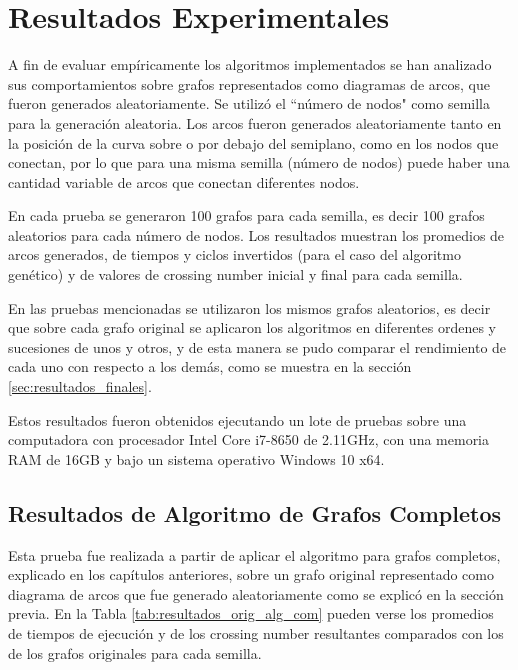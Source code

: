 \chapter{Resultados Experimentales}\label{cap5}
A fin de evaluar empíricamente los algoritmos implementados se han analizado sus comportamientos sobre grafos representados como diagramas de arcos, que fueron generados aleatoriamente. Se utilizó el ``número de nodos" como semilla para la generación aleatoria. Los arcos fueron generados aleatoriamente tanto en la posición de la curva sobre o por debajo del semiplano, como en los nodos que conectan, por lo que para una misma semilla (número de nodos) puede haber una cantidad variable de arcos que conectan diferentes nodos. 

En cada prueba se generaron 100 grafos para cada semilla, es decir 100 grafos aleatorios para cada número de nodos. Los resultados muestran los promedios de arcos generados, de tiempos y ciclos invertidos (para el caso del algoritmo genético) y de valores de crossing number inicial y final para cada semilla. 

En las pruebas mencionadas se utilizaron los mismos grafos aleatorios, es decir que sobre cada grafo original se aplicaron los algoritmos en diferentes ordenes y sucesiones de unos y otros, y de esta manera se pudo comparar el rendimiento de cada uno con respecto a los demás, como se muestra en la sección \ref{sec:resultados_finales}.

Estos resultados fueron obtenidos ejecutando un lote de pruebas sobre una computadora con procesador Intel Core i7-8650 de 2.11GHz, con una memoria RAM de 16GB y bajo un sistema operativo Windows 10 x64.

\section{Resultados de Algoritmo de Grafos Completos}
Esta prueba fue realizada a partir de aplicar el algoritmo para grafos completos, explicado en los capítulos anteriores, sobre un grafo original representado como diagrama de arcos que fue generado aleatoriamente como se explicó en la sección previa. En la Tabla \ref{tab:resultados_orig_alg_com} pueden verse los promedios de tiempos de ejecución y de los crossing number resultantes comparados con los de los grafos originales para cada semilla.

